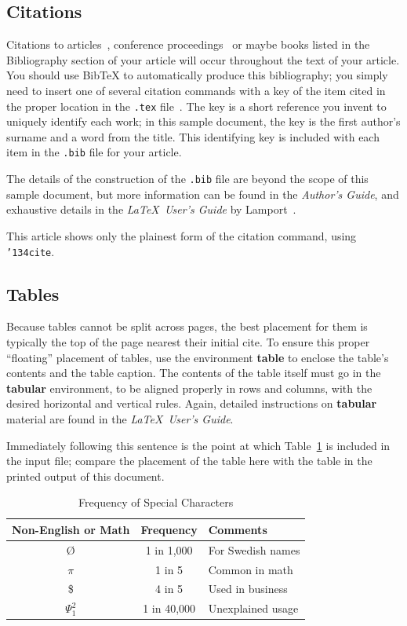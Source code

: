 \subsection{Citations}
Citations to articles~\cite{bowman:reasoning,
clark:pct, braams:babel, herlihy:methodology},
conference proceedings~\cite{clark:pct} or maybe
books \cite{Lamport:LaTeX, salas:calculus} listed
in the Bibliography section of your
article will occur throughout the text of your article.
You should use BibTeX to automatically produce this bibliography;
you simply need to insert one of several citation commands with
a key of the item cited in the proper location in
the \texttt{.tex} file~\cite{Lamport:LaTeX}.
The key is a short reference you invent to uniquely
identify each work; in this sample document, the key is
the first author's surname and a
word from the title.  This identifying key is included
with each item in the \texttt{.bib} file for your article.

The details of the construction of the \texttt{.bib} file
are beyond the scope of this sample document, but more
information can be found in the \textit{Author's Guide},
and exhaustive details in the \textit{\LaTeX\ User's
Guide} by Lamport~.


This article shows only the plainest form
of the citation command, using \texttt{{\char'134}cite}.

\subsection{Tables}
Because tables cannot be split across pages, the best
placement for them is typically the top of the page
nearest their initial cite.  To
ensure this proper ``floating'' placement of tables, use the
environment \textbf{table} to enclose the table's contents and
the table caption.  The contents of the table itself must go
in the \textbf{tabular} environment, to
be aligned properly in rows and columns, with the desired
horizontal and vertical rules.  Again, detailed instructions
on \textbf{tabular} material
are found in the \textit{\LaTeX\ User's Guide}.

Immediately following this sentence is the point at which
Table~\ref{tab:freq} is included in the input file; compare the
placement of the table here with the table in the printed
output of this document.

\begin{table}
  \caption{Frequency of Special Characters}
  \label{tab:freq}
  \begin{tabular}{ccl}
    \toprule
    Non-English or Math&Frequency&Comments\\
    \midrule
    \O & 1 in 1,000& For Swedish names\\
    $\pi$ & 1 in 5& Common in math\\
    \$ & 4 in 5 & Used in business\\
    $\Psi^2_1$ & 1 in 40,000& Unexplained usage\\
  \bottomrule
\end{tabular}
\end{table}

